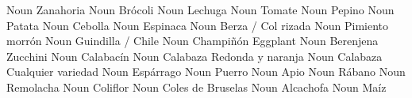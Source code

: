                {}              {Noun}      {Zanahoria}             {}
             {}              {Noun}      {Brócoli}               {}
              {}              {Noun}      {Lechuga}               {}
               {}              {Noun}      {Tomate}                {}
             {}              {Noun}      {Pepino}                {}
               {}              {Noun}      {Patata}                {}
                {}              {Noun}      {Cebolla}               {}
              {}              {Noun}      {Espinaca}              {}
                 {}              {Noun}      {Berza / Col rizada}    {}
          {}              {Noun}      {Pimiento morrón}       {}
         {}              {Noun}      {Guindilla / Chile}     {}
             {}              {Noun}      {Champiñón}             {}
            {Eggplant}      {Noun}      {Berenjena}             {}
            {Zucchini}      {Noun}      {Calabacín}             {}
              {}              {Noun}      {Calabaza}              {Redonda y naranja}
               {}              {Noun}      {Calabaza}              {Cualquier variedad}
            {}              {Noun}      {Espárrago}             {}
                 {}              {Noun}      {Puerro}                {}
               {}              {Noun}      {Apio}                  {}
               {}              {Noun}      {Rábano}                {}
             {}              {Noun}      {Remolacha}             {}
          {}              {Noun}      {Coliflor}              {}
      {}              {Noun}      {Coles de Bruselas}     {}
            {}              {Noun}      {Alcachofa}             {}
                 {}              {Noun}      {Maíz}                  {}

